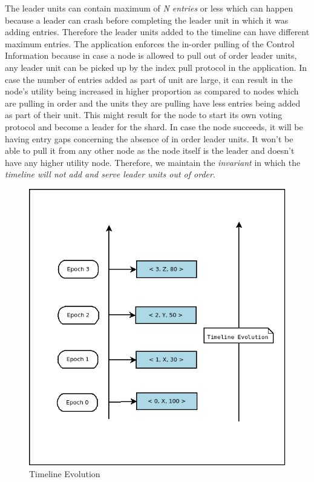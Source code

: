 \documentclass[a4paper,11pt]{kth-mag}
\begin{document}
\par The leader units can contain maximum of \textit{N entries} or less which can happen because a leader can crash before completing the leader unit in which it was adding entries. Therefore the leader units added to the timeline can have different maximum entries. The application enforces the in-order pulling of the Control Information because in case a node is allowed to pull out of order leader units, any leader unit can be picked up by the index pull protocol in the application. In case the number of entries added as part of unit are large, it can result in the node's utility being increased in higher proportion as compared to nodes which are pulling in order and the units they are pulling have less entries being added as part of their unit. This might result for the node to start its own voting protocol and  become a leader for the shard. In case the node succeeds, it will be having entry gaps concerning the absence of in order leader units. It won't be able to pull it from any other node as the node itself is the leader and doesn't have any higher utility node. Therefore, we maintain the \textit{invariant} in which the \textit{timeline will not add and serve leader units out of order}.

\begin{figure}
	\includegraphics[scale=0.5]{timeline_new}
	\centering
	\caption{Timeline Evolution}
	\label{fig:timeline}
\end{figure}
\end{document}
